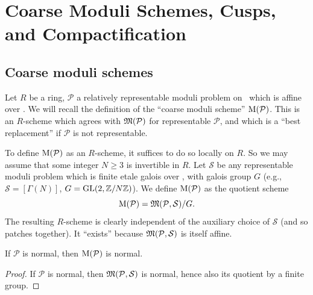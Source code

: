 \chapter{Coarse Moduli Schemes, Cusps, and Compactification}
\label{ch:8}

\section{Coarse moduli schemes}
\label{sec:8.1}

\kmitem\label{item:8.1.1}
Let $R$ be a ring, $\mathcal{P}$ a relatively representable moduli problem on \EllR\ which is affine over \EllR. We will recall the definition of the ``coarse moduli scheme'' $\mathrm{M}(\mathcal{P})$. This is an $R$-scheme which agrees with $\mathfrak{M}(\mathcal{P})$ for representable $\mathcal{P}$, and which is a ``best replacement'' if $\mathcal{P}$ is not representable.

To define $\mathrm{M}(\mathcal{P})$ as an $R$-scheme, it suffices to do so locally on $R$. So we may assume that some integer $N \ge 3$ is invertible in $R$. Let $\mathcal{S}$ be any representable moduli problem which is finite etale galois over \EllR, with galois group $G$ (e.g., $\mathcal{S} = [\Gamma(N)]$, $G = \operatorname{GL}(2, \mathbb{Z}/N\mathbb{Z})$). We define $\mathrm{M}(\mathcal{P})$ as the quotient scheme
\[
\mathrm{M}(\mathcal{P}) = \mathfrak{M}(\mathcal{P}, \mathcal{S})/G .
\]
The resulting $R$-scheme is clearly independent of the auxiliary choice of $\mathcal{S}$ (and so patches together). It ``exists'' because $\mathfrak{M}(\mathcal{P}, \mathcal{S})$ is itself affine.

\begin{klem}\label{lem:8.1.2}
If $\mathcal{P}$ is normal, then $\mathrm{M}(\mathcal{P})$ is normal.
\end{klem}

\begin{proof}
If $\mathcal{P}$ is normal, then $\mathfrak{M}(\mathcal{P}, \mathcal{S})$ is normal, hence also its quotient by a finite group.
\end{proof}

